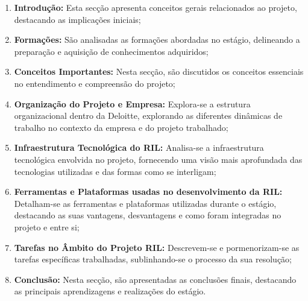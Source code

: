     \begin{enumerate}
        \item \textbf{Introdução:} Esta secção apresenta conceitos gerais relacionados ao projeto, destacando as implicações iniciais;
        \item \textbf{Formações:} São analisadas as formações abordadas no estágio, delineando a preparação e aquisição de conhecimentos adquiridos;
        \item \textbf{Conceitos Importantes:} Nesta secção, são discutidos os  conceitos essenciais no entendimento e compreensão do projeto;
        \item \textbf{Organização do Projeto e Empresa:} Explora-se a estrutura organizacional dentro da Deloitte, explorando as diferentes dinâmicas de trabalho no contexto da empresa e do projeto trabalhado;
        \item \textbf{Infraestrutura Tecnológica do RIL:} Analisa-se a infraestrutura tecnológica envolvida no projeto, fornecendo uma visão mais aprofundada das tecnologias utilizadas e das formas como se interligam;
        \item \textbf{Ferramentas e Plataformas usadas no desenvolvimento da RIL:} Detalham-se as ferramentas e plataformas utilizadas durante o estágio, destacando as suas vantagens, desvantagens e como foram integradas no projeto e entre si;
        \item \textbf{Tarefas no Âmbito do Projeto RIL:} Descrevem-se e pormenorizam-se as tarefas específicas trabalhadas, sublinhando-se o processo da sua resolução;
        \item \textbf{Conclusão:} Nesta secção, são apresentadas as conclusões finais, destacando as principais aprendizagens e realizações do estágio.
    \end{enumerate}

    
